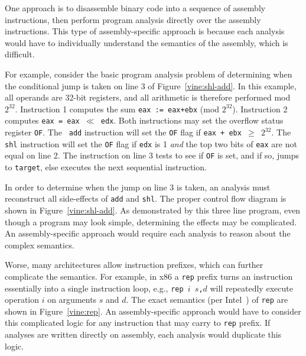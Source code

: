 One approach is to disassemble binary code into a sequence of assembly
instructions, then perform program analysis directly over the assembly
instructions.  This type of assembly-specific approach is \naive
because each analysis would have to individually understand the
semantics of the assembly, which is difficult.

For example, consider the basic program analysis problem of
determining when the conditional jump is taken on line 3 of
Figure~\ref{vine:shl-add}. In this example, all operands are 32-bit
registers, and all arithmetic is therefore performed mod
$2^{32}$. Instruction 1 computes the sum {\tt eax := eax+ebx} (mod
$2^{32}$).  Instruction 2 computes {\tt eax = eax $\ll$ edx}.  Both
instructions may set the overflow status register {\tt OF}. The {\tt
  add} instruction will set the {\tt OF} flag if {\tt eax + ebx $\geq$
  $2^{32}$}.  The {\tt shl} instruction will set the {\tt OF} flag if
{\tt edx} is 1 \emph{and} the top two bits of {\tt eax} are not equal
on line 2. The instruction on line 3 tests to see if {\tt OF} is set,
and if so, jumps to {\tt target}, else executes the next sequential
instruction. 

In order to determine when the jump on line 3 is taken, an analysis
must reconstruct all side-effects of {\tt add} and {\tt shl}.  The
proper control flow diagram is shown in Figure~\ref{vine:shl-add}.  As
demonstrated by this three line program, even though a program may look
simple, determining the effects may be complicated. An
assembly-specific approach would require each analysis to reason about
the complex semantics.


Worse, many architectures allow instruction prefixes, which can further
complicate the semantics. For example, in x86 a {\tt rep} prefix turns
an instruction essentially into a single instruction loop, e.g.,
{\tt rep $i$ $s$,$d$} will repeatedly execute operation $i$ on
arguments $s$ and $d$.  The exact semantics (per
Intel~\cite{intel:x86}) of {\tt rep} are shown in
Figure~\ref{vine:rep}. An assembly-specific approach would have to
consider this complicated logic for any instruction that may carry to
{\tt rep} prefix. If analyses are written directly on assembly, each
analysis would duplicate this logic.


